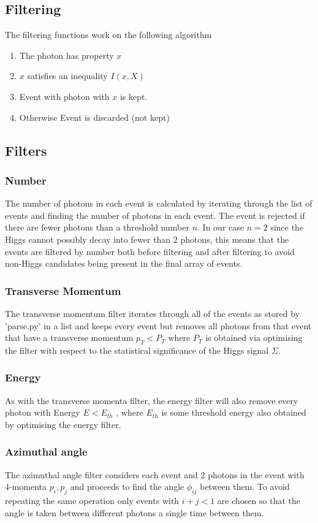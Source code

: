 \documentclass{article}
\begin{document}
\subsection{Filtering}
The filtering functions work on the following algorithm
\begin{enumerate}
\item The photon has property $x$
\item $x$ satisfies an inequality $I(x, X)$
\item Event with photon with $x$ is kept.
\item Otherwise Event is discarded (not kept)
\end{enumerate}
\subsection{Filters}
\subsubsection{Number}
The number of photons in each event is calculated by iterating through the list of events and finding the number of photons in each event. The event is rejected if there are fewer photons than a threshold number $n$. In our case $n=2$ since the Higgs cannot possibly decay into fewer than 2 photons, this means that the events are filtered by number both before filtering and after filtering to avoid non-Higgs candidates being present in the final array of events. 
\subsubsection{Transverse Momentum}
The transverse momentum filter iterates through all of the events as stored by 'parse.py' in a list and keeps every event but removes all photons from that event that have a transverse momentum $p_T < P_T$ where $P_T$ is obtained via optimising the filter with respect to the statistical significance of the Higgs signal $\Sigma$. 
\subsubsection{Energy}
As with the transverse momenta filter, the energy filter will also remove every photon with Energy $E< E_{th}$ , where $E_{th}$ is some threshold energy also obtained by optimising the energy filter. 
\subsubsection{Azimuthal angle}
The azimuthal angle filter considers each event and 2 photons in the event with 4-momenta $p_i, p_j$ and proceeds to find the angle $\phi_{ij}$ between them. To avoid repeating the same operation only events with $i+j<1$ are chosen so that the angle is taken between different photons a single time between them.
\end{document}
